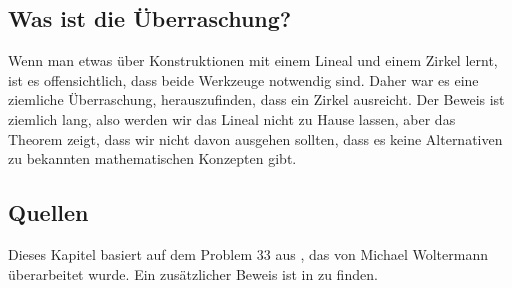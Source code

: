 \subsection*{Was ist die Überraschung?}

Wenn man etwas über Konstruktionen mit einem Lineal und einem Zirkel lernt, ist es offensichtlich, dass beide Werkzeuge notwendig sind. Daher war es eine ziemliche Überraschung, herauszufinden, dass ein Zirkel ausreicht. Der Beweis ist ziemlich lang, also werden wir das Lineal nicht zu Hause lassen, aber das Theorem zeigt, dass wir nicht davon ausgehen sollten, dass es keine Alternativen zu bekannten mathematischen Konzepten gibt.

\subsection*{Quellen}

Dieses Kapitel basiert auf dem Problem $33$ aus \cite{dorrie1}, das von Michael Woltermann \cite{dorrie2} überarbeitet wurde. Ein zusätzlicher Beweis ist in \cite{mm} zu finden.
